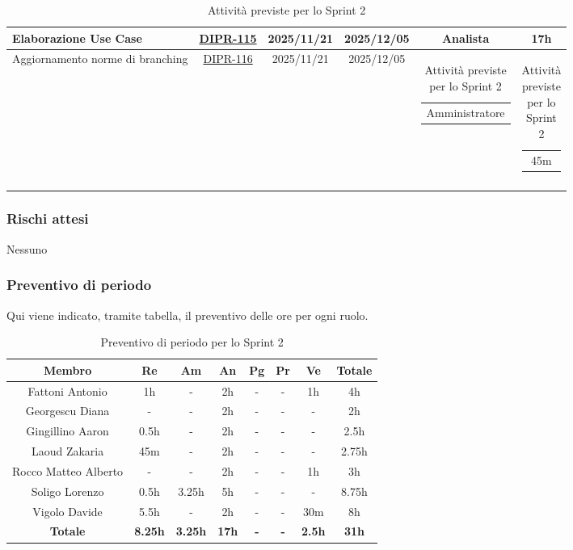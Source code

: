 \documentclass[a4paper,12pt]{article}
\begin{document}
\begin{spacing}{1}
\begin{longtable}{|p{4cm}|c|c|c|c|c|}
            \hline
            Elaborazione Use Case & \href{https://7zpus.atlassian.net/browse/DIPR-115}{DIPR-115} & 2025/11/21 & 2025/12/05 & Analista & 17h\\
            \hline
            Aggiornamento norme di branching & \href{https://7zpus.atlassian.net/browse/DIPR-116}{DIPR-116} & 2025/11/21 & 2025/12/05 & \begin{tabular}[c]{@{}c@{}} Amministratore \end{tabular} & \begin{tabular}[c]{@{}c@{}} 45m \end{tabular} \\ %
            \hline
    \caption{Attività previste per lo Sprint 2}

    \end{longtable}
    \end{spacing}


\subsubsection{Rischi attesi}
Nessuno

\subsubsection{Preventivo di periodo}
Qui viene indicato, tramite tabella, il preventivo delle ore per ogni ruolo.
\begin{table}[H]
    \begin{adjustwidth}{-4cm}{-4cm}
    \centering
    \begin{tabular}{|c|c|c|c|c|c|c|c|}
        \hline
        \textbf{Membro}& \textbf{Re} & \textbf{Am} & \textbf{An} & \textbf{Pg} & \textbf{Pr} & \textbf{Ve} & \textbf{Totale} \\
        \hline
        Fattoni Antonio         & 1h    & -     & 2h & - & - & 1h   & 4h\\
        \hline
        Georgescu Diana         & -     & -     & 2h & - & - & -    & 2h \\
        \hline
        Gingillino Aaron        & 0.5h  & -     & 2h & - & - & -    & 2.5h \\
        \hline
        Laoud Zakaria           & 45m   & -     & 2h & - & - & -    & 2.75h\\
        \hline
        Rocco Matteo Alberto    & -     & -     & 2h & - & - & 1h   & 3h\\
        \hline
        Soligo Lorenzo          & 0.5h  & 3.25h & 5h & - & - & -    & 8.75h\\
        \hline
        Vigolo Davide           & 5.5h  & -     & 2h & - & - & 30m  & 8h \\
        \hline
        \textbf{Totale} & \textbf{8.25h}& \textbf{3.25h} & \textbf{17h}& \textbf{-}& \textbf{-}& \textbf{2.5h}& \textbf{31h}\\
        \hline
    \end{tabular}
    \caption{Preventivo di periodo per lo Sprint 2}
    \end{adjustwidth}
\end{table}
\end{document}

